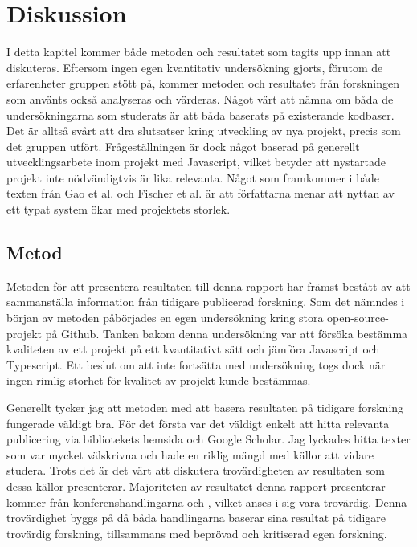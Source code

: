 \section{Diskussion}
\label{sec:alexander-discussion}

I detta kapitel kommer både metoden och resultatet som tagits upp innan att diskuteras. Eftersom ingen egen kvantitativ undersökning gjorts, förutom de erfarenheter gruppen stött på, kommer metoden och resultatet från forskningen som använts också analyseras och värderas.  Något värt att nämna om båda de undersökningarna som studerats är att båda baserats på existerande kodbaser. Det är alltså svårt att dra slutsatser kring utveckling av nya projekt, precis som det gruppen utfört. Frågeställningen är dock något baserad på generellt utvecklingsarbete inom projekt med Javascript, vilket betyder att nystartade projekt inte nödvändigtvis är lika relevanta. Något som framkommer i både texten från Gao et al. och Fischer et al. är att författarna menar att nyttan av ett typat system ökar med projektets storlek. 


\subsection{Metod}
\label{subsec:alexander-discussion-method}

Metoden för att presentera resultaten till denna rapport har främst bestått av att sammanställa information från tidigare publicerad forskning. Som det nämndes i början av metoden påbörjades en egen undersökning kring stora open-source-projekt på Github. Tanken bakom denna undersökning var att försöka bestämma kvaliteten av ett projekt på ett kvantitativt sätt och jämföra Javascript och Typescript. Ett beslut om att inte fortsätta med undersökning togs dock när ingen rimlig storhet för kvalitet av projekt kunde bestämmas.

Generellt tycker jag att metoden med att basera resultaten på tidigare forskning fungerade väldigt bra. För det första var det väldigt enkelt att hitta relevanta publicering via bibliotekets hemsida och Google Scholar. Jag lyckades hitta texter som var mycket välskrivna och hade en riklig mängd med källor att vidare studera. Trots det är det värt att diskutera trovärdigheten av resultaten som dessa källor presenterar. Majoriteten av resultatet denna rapport presenterar kommer från konferenshandlingarna \cite{Fischer:2015:EIE:2816707.2816720} och \cite{type-or-not-proceed}, vilket anses i sig vara trovärdig. Denna trovärdighet byggs på då båda handlingarna baserar sina resultat på tidigare trovärdig forskning, tillsammans med beprövad och kritiserad egen forskning. 

